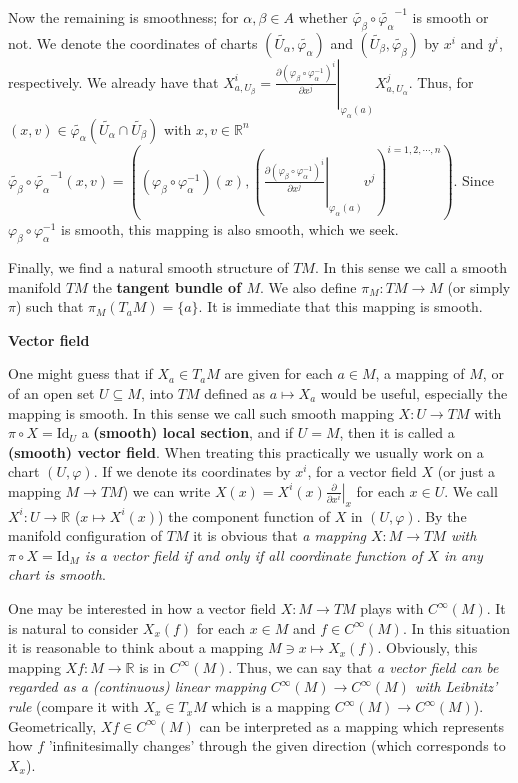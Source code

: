\documentclass{article}
\newcommand{\ReR}{\mathbb{R}}
\newcommand{\parderbar}[3]{\left. \frac{\partial #1}{\partial #2} \right|_{#3}}
\begin{document}
Now the remaining is smoothness; for $\alpha, \beta \in A$ whether $\tilde{\varphi_\beta} \circ \tilde{\varphi_\alpha}^{-1}$ is smooth or not.
We denote the coordinates of charts $(\tilde{U_\alpha}, \tilde{\varphi_\alpha})$ and $(\tilde{U_\beta}, \tilde{\varphi_\beta})$ by $x^i$ and $y^i$, respectively.
We already have that $X_{a, U_\beta}^i = \parderbar{(\varphi_\beta \circ \varphi_\alpha^{-1})^i}{x^j}{\varphi_\alpha(a)} X_{a, U_\alpha}^j$.
Thus, for $(x, v) \in \tilde{\varphi_\alpha}(\tilde{U_\alpha} \cap \tilde{U_\beta})$ with $x, v \in \ReR^n$ $\tilde{\varphi_\beta} \circ \tilde{\varphi_\alpha}^{-1}(x, v) = ((\varphi_\beta \circ \varphi_\alpha^{-1})(x), (\parderbar{(\varphi_\beta \circ \varphi_\alpha^{-1})^i}{x^j}{\varphi_\alpha(a)} v^j)^{i = 1, 2, \cdots, n})$.
Since $\varphi_\beta \circ \varphi_\alpha^{-1}$ is smooth, this mapping is also smooth, which we seek.

Finally, we find a natural smooth structure of $TM$.
In this sense we call a smooth manifold $TM$ the \textbf{tangent bundle of $M$}.
We also define $\pi_M : TM \to M$ (or simply $\pi$) such that $\pi_M(T_a M) = \{a\}$.
It is immediate that this mapping is smooth.

\newpage

\textbf{Vector field}

One might guess that if $X_a \in T_a M$ are given for each $a \in M$, a mapping of $M$, or of an open set $U \subseteq M$, into $TM$ defined as $a \mapsto X_a$ would be useful, especially the mapping is smooth.
In this sense we call such smooth mapping $X : U \to TM$ with $\pi \circ X = \textrm{Id}_U$ a \textbf{(smooth) local section}, and if $U = M$, then it is called a \textbf{(smooth) vector field}.
When treating this practically we usually work on a chart $(U, \varphi)$.
If we denote its coordinates by $x^i$, for a vector field $X$ (or just a mapping $M \to TM$) we can write $X(x) = X^i(x) \parderbar{}{x^i}{x}$ for each $x \in U$.
We call $X^i : U \to \ReR$ ($x \mapsto X^i(x)$) the \textrm{component function of $X$ in $(U, \varphi)$}.
By the manifold configuration of $TM$ it is obvious that \textit{a mapping $X : M \to TM$ with $\pi \circ X = \textrm{Id}_M$ is a vector field if and only if all coordinate function of $X$ in any chart is smooth}.

One may be interested in how a vector field $X : M \to TM$ plays with $C^\infty(M)$.
It is natural to consider $X_x(f)$ for each $x \in M$ and $f \in C^\infty(M)$.
In this situation it is reasonable to think about a mapping $M \ni x \mapsto X_x(f)$.
Obviously, this mapping $Xf : M \to \ReR$ is in $C^\infty(M)$.
Thus, we can say that \textit{a vector field can be regarded as a (continuous) linear mapping $C^\infty(M) \to C^\infty(M)$ with Leibnitz' rule} (compare it with $X_x \in T_xM$ which is a mapping $C^\infty(M) \to C^\infty(M)$).
Geometrically, $Xf \in C^\infty(M)$ can be interpreted as a mapping which represents how $f$ 'infinitesimally changes' through the given direction (which corresponds to $X_x$).
\end{document}
